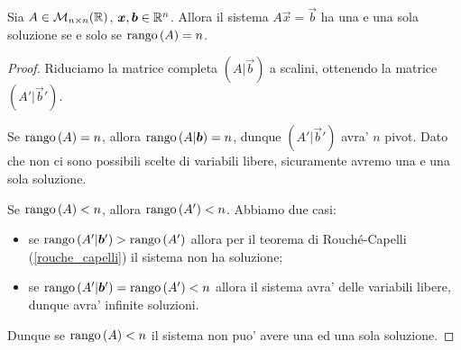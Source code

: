 \begin{proposition}\label{sistema_quadrato_n_pivot_unica_soluzione}
    Sia $A \in \mathcal{M}_{n \times n}(\mathbb{R})$, $\bm{x}, \bm{b} \in \mathbb{R}^n$. Allora il sistema $A\vec x = \vec b$ ha una e una sola soluzione se e solo se $\operatorname{rango}\left( A \right) = n$.
\end{proposition}
\begin{proof}
    Riduciamo la matrice completa $(A | \vec b)$ a scalini, ottenendo la matrice $(A' | \vec b')$.

    Se $\operatorname{rango}\left( A \right) = n$, allora $\operatorname{rango}\left( A | \bm{b} \right) = n$, dunque $(A' | \vec b')$ avra' $n$ pivot. Dato che non ci sono possibili scelte di variabili libere, sicuramente avremo una e una sola soluzione.

    Se $\operatorname{rango}\left( A \right) < n$, allora $\operatorname{rango}\left( A' \right) < n$. Abbiamo due casi: \begin{itemize}
        \item se $\operatorname{rango}\left( A' | \bm{b}' \right) > \operatorname{rango}\left( A' \right)$ allora per il teorema  di Rouché-Capelli (\ref{rouche_capelli}) il sistema non ha soluzione;
        \item se $\operatorname{rango}\left( A' | \bm{b}' \right) = \operatorname{rango}\left( A' \right) < n$ allora il sistema avra' delle variabili libere, dunque avra' infinite soluzioni.
    \end{itemize}
    Dunque se $\operatorname{rango}\left( A \right) < n$ il sistema non puo' avere una ed una sola soluzione.
\end{proof}

